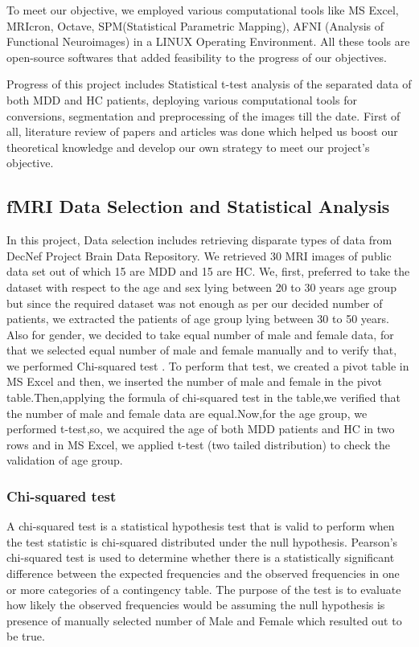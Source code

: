 \documentclass{article}
\begin{document}
To meet our objective, we employed various computational tools like MS
Excel, MRIcron, Octave, SPM(Statistical Parametric Mapping), AFNI
(Analysis of Functional Neuroimages) in a LINUX Operating Environment.
All these tools are open-source softwares that added feasibility to
the progress of our objectives.


Progress of this project includes Statistical t-test analysis of the
separated data of both MDD and HC patients, deploying various
computational tools for conversions, segmentation and preprocessing of
the images till the date. First of all, literature review of papers
and articles was done which helped us boost our theoretical knowledge
and develop our own strategy to meet our project's objective.

\subsection{fMRI Data Selection and Statistical Analysis}

In this project, Data selection includes retrieving disparate types of
data from DecNef Project Brain Data Repository. We retrieved 30 MRI
images of public data set out of which 15 are MDD and 15 are HC. We,
first, preferred to take the dataset with respect to the age and sex
lying between 20 to 30 years age group but since the required dataset
was not enough as per our decided number of patients, we extracted the
patients of age group lying between 30 to 50 years. Also for gender,
we decided to take equal number of male and female data, for that we
selected equal number of male and female manually and to verify that,
we performed Chi-squared test . To perform that test, we created a
pivot table in MS Excel and then, we inserted the number of male and
female in the pivot table.Then,applying the formula of chi-squared
test in the table,we verified that the number of male and female data
are equal.Now,for the age group, we performed t-test,so, we acquired
the age of both MDD patients and HC in two rows and in MS Excel, we
applied t-test (two tailed distribution) to check the validation of
age group.

\subsubsection{Chi-squared test}

A chi-squared test is a statistical hypothesis test that is valid to
perform when the test statistic is chi-squared distributed under the
null hypothesis. Pearson's chi-squared test is used to determine
whether there is a statistically significant difference between the
expected frequencies and the observed frequencies in one or more
categories of a contingency table. The purpose of the test is to
evaluate how likely the observed frequencies would be assuming the
null hypothesis is
presence of manually selected number of Male and Female which resulted
out to be true.
\end{document}
